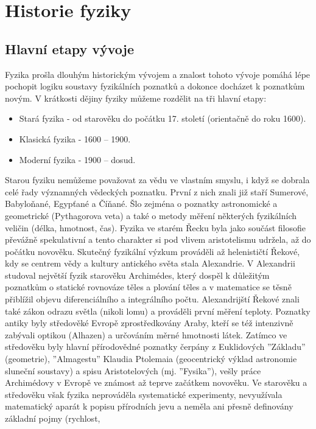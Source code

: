 \chapter{Historie fyziky}
\minitoc
\newpage
  \section{Hlavní etapy vývoje}
    Fyzika prošla dlouhým historickým vývojem a znalost tohoto vývoje pomáhá lépe pochopit logiku soustavy
    fyzikálních poznatků a dokonce do\-cházet k poznatkům novým. V krátkosti dějiny fyziky můžeme 
    rozdělit na 
    tři hlavní etapy:
    \begin{itemize}
     	\item Stará fyzika - od starověku do počátku 17. století (orientačně do roku 1600).
     \item Klasická fyzika - 1600 – 1900.
     \item Moderní fyzika - 1900 – dosud.
    \end{itemize}
    Starou fyziku nemůžeme považovat za vědu ve vlastním smyslu, i když se dobrala celé řady významných 
    vědeckých poznatku. První z nich znali již staří Sumerové, Babyloňané, Egypťané a Číňané. Šlo zejména 
    o  poznatky astronomické a geometrické (Pythagorova veta) a také o metody měření některých 
    fyzikálních veličin (délka, hmotnost, čas). Fyzika ve starém Řecku byla jako součást filosofie 
    převážně spekulativní a tento charakter si pod vlivem aristotelismu udržela, až do počátku novověku. 
    Skutečný fyzikální výzkum prováděli až helenističtí Řekové, kdy se centrem vědy a kultury antického 
    světa stala Alexandrie. V Alexandrii studoval největší fyzik starověku Archimédes, který dospěl k 
    důležitým poznatkům o statické rovnováze těles a plování těles a v matematice se těsně přiblížil 
    objevu diferenciálního a integrálního počtu. Alexandrijští Řekové znali také zákon odrazu světla 
    (nikoli lomu) a prováděli první měření teploty. Poznatky antiky byly středověké Evropě 
    zprostředkovány Araby, kteří se též intenzivně zabývali optikou (Alhazen) a určováním měrné hmotnosti 
    látek. Zatímco ve středověku byly hlavní přírodovědné poznatky čerpány z Euklidových ”Základu” 
    (geometrie), ”Almagestu” Klaudia Ptolemaia (geocentrický výklad astronomie sluneční soustavy) a spisu 
    Aristotelových (mj. ”Fysika”), vešly práce Archimédovy v Evropě ve známost až teprve začátkem 
    novověku. Ve starověku a středověku však fyzika neprováděla systematické experimenty, nevyužívala 
    matematický aparát k popisu přírodních jevu a neměla ani přesně definovány základní pojmy (rychlost, 
